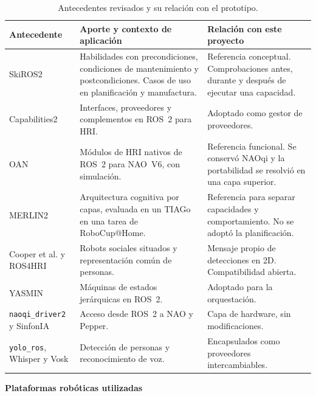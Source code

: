 \documentclass[11pt,letterpaper]{article}
\newcommand{\code}[1]{\nolinkurl{#1}}
\begin{document}
\begin{table}[htbp]
\centering\small
\caption{Antecedentes revisados y su relación con el prototipo.}\label{tab:antecedentes}
\begin{tabularx}{\linewidth}{@{}P{3.1cm}YY@{}}
\toprule
Antecedente & Aporte y contexto de aplicación & Relación con este proyecto \\
\midrule
SkiROS2 \cite{skiros} & Habilidades con precondiciones, condiciones de mantenimiento y postcondiciones. Casos de uso en planificación y manufactura. & Referencia conceptual. Comprobaciones antes, durante y después de ejecutar una capacidad. \\
Capabilities2 \cite{capabilities2} & Interfaces, proveedores y complementos en ROS~2 para HRI. & Adoptado como gestor de proveedores. \\
OAN \cite{oan} & Módulos de HRI nativos de ROS~2 para NAO~V6, con simulación. & Referencia funcional. Se conservó NAOqi y la portabilidad se resolvió en una capa superior. \\
MERLIN2 \cite{merlin2} & Arquitectura cognitiva por capas, evaluada en un TIAGo en una tarea de RoboCup@Home. & Referencia para separar capacidades y comportamiento. No se adoptó la planificación. \\
Cooper et al. y ROS4HRI \cite{cooper,ros4hritutorial} & Robots sociales situados y representación común de personas. & Mensaje propio de detecciones en 2D. Compatibilidad abierta. \\
YASMIN \cite{yasmin} & Máquinas de estados jerárquicas en ROS~2. & Adoptado para la orquestación. \\
\code{naoqi_driver2} y SinfonIA \cite{naoqidriver,sinfonia} & Acceso desde ROS~2 a NAO y Pepper. & Capa de hardware, sin modificaciones. \\
\code{yolo_ros}, Whisper y Vosk \cite{yoloros,whisper,vosk} & Detección de personas y reconocimiento de voz. & Encapsulados como proveedores intercambiables. \\
\bottomrule
\end{tabularx}
\end{table}

\par\medskip\noindent\textbf{Plataformas robóticas utilizadas}\par
\end{document}
